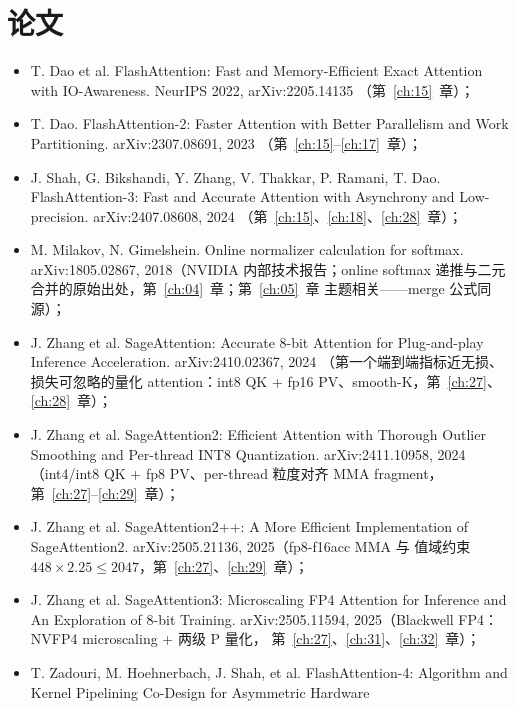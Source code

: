 \section{论文}

\begin{itemize}
  \item T. Dao et al. FlashAttention: Fast and Memory-Efficient Exact
        Attention with IO-Awareness. NeurIPS 2022, arXiv:2205.14135
        （第~\ref{ch:15}~章）；
  \item T. Dao. FlashAttention-2: Faster Attention with Better Parallelism
        and Work Partitioning. arXiv:2307.08691, 2023
        （第~\ref{ch:15}--\ref{ch:17}~章）；
  \item J. Shah, G. Bikshandi, Y. Zhang, V. Thakkar, P. Ramani, T. Dao.
        FlashAttention-3: Fast and Accurate Attention with Asynchrony and
        Low-precision. arXiv:2407.08608, 2024
        （第~\ref{ch:15}、\ref{ch:18}、\ref{ch:28}~章）；
  \item M. Milakov, N. Gimelshein. Online normalizer calculation for
        softmax. arXiv:1805.02867, 2018（NVIDIA 内部技术报告；online
        softmax 递推与二元合并的原始出处，第~\ref{ch:04}~章；第~\ref{ch:05}~章
        主题相关——merge 公式同源）；
  \item J. Zhang et al. SageAttention: Accurate 8-bit Attention for
        Plug-and-play Inference Acceleration. arXiv:2410.02367, 2024
        （第一个端到端指标近无损、损失可忽略的量化 attention：int8 QK +
        fp16 PV、smooth-K，第~\ref{ch:27}、\ref{ch:28}~章）；
  \item J. Zhang et al. SageAttention2: Efficient Attention with Thorough
        Outlier Smoothing and Per-thread INT8 Quantization. arXiv:2411.10958,
        2024（int4/int8 QK + fp8 PV、per-thread 粒度对齐 MMA fragment，
        第~\ref{ch:27}--\ref{ch:29}~章）；
  \item J. Zhang et al. SageAttention2++: A More Efficient Implementation
        of SageAttention2. arXiv:2505.21136, 2025（fp8-f16acc MMA 与
        值域约束 $448\times2.25\le2047$，第~\ref{ch:27}、\ref{ch:29}~章）；
  \item J. Zhang et al. SageAttention3: Microscaling FP4 Attention for
        Inference and An Exploration of 8-bit Training. arXiv:2505.11594,
        2025（Blackwell FP4：NVFP4 microscaling + 两级 P 量化，
        第~\ref{ch:27}、\ref{ch:31}、\ref{ch:32}~章）；
  \item T. Zadouri, M. Hoehnerbach, J. Shah, et al. FlashAttention-4:
        Algorithm and Kernel Pipelining Co-Design for Asymmetric Hardware

\end{itemize}
